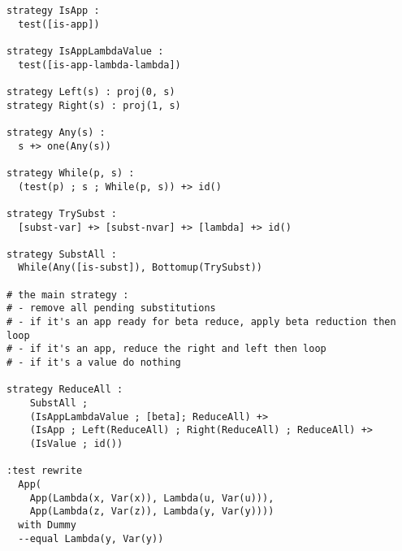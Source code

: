 \documentclass[12pt,a4paper]{article}
\begin{document}
{\begin{verbatim}
strategy IsApp :
  test([is-app])

strategy IsAppLambdaValue :
  test([is-app-lambda-lambda])

strategy Left(s) : proj(0, s)
strategy Right(s) : proj(1, s)

strategy Any(s) : 
  s +> one(Any(s))

strategy While(p, s) :
  (test(p) ; s ; While(p, s)) +> id()

strategy TrySubst :
  [subst-var] +> [subst-nvar] +> [lambda] +> id()

strategy SubstAll :
  While(Any([is-subst]), Bottomup(TrySubst))

# the main strategy : 
# - remove all pending substitutions
# - if it's an app ready for beta reduce, apply beta reduction then loop
# - if it's an app, reduce the right and left then loop
# - if it's a value do nothing

strategy ReduceAll :
    SubstAll ;
    (IsAppLambdaValue ; [beta]; ReduceAll) +>
    (IsApp ; Left(ReduceAll) ; Right(ReduceAll) ; ReduceAll) +>
    (IsValue ; id())
    
:test rewrite 
  App(
    App(Lambda(x, Var(x)), Lambda(u, Var(u))), 
    App(Lambda(z, Var(z)), Lambda(y, Var(y))))
  with Dummy
  --equal Lambda(y, Var(y))
\end{verbatim}
}
\end{document}
